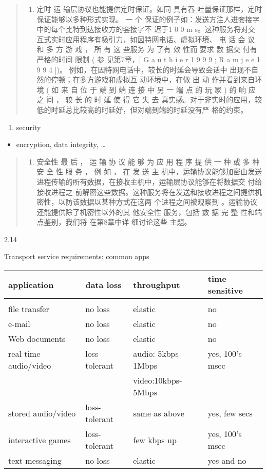 \documentclass[
]{article}
\begin{document}
\begin{quote}
\begin{enumerate}
\def\labelenumi{\arabic{enumi}.}
\item
  定时 运 输层协议也能提供定时保证。如同 具有吞
  吐量保证那样，定时保证能够以多种形式实现。 一 个
  保证的例子如：发送方注人进套接字中的每个比特到达接收方的套接字不 迟于1
  0 0 m s。这种服务将对交
  互式实时应用程序有吸引力，如因特网电话、虚拟环境、 电 话 会 议 和 多
  方 游 戏 ， 所 有 这 些服务 为 了有 效 性而 要求 数 据交
  付有严格的时间 限制 ( 参 见第7章，{[} G a u t h i e r 1 9 9 9 ; R a m
  j e e 1 9 9 4 {]})。 例如，在因特网电话中，较长的时延会导致会话中
  出现不自然的停顿；在多方游戏和虚拟互 动环境中，在做 出 动
  作并看到来自环境 ( 如 来 自 位 于 端 到 端 连 接 中 另 一 端 点 的 玩
  家 ) 的 响 应 之 间 ， 较 长 的 时 延 使 得 它 失 去
  真实感。对于非实时的应用，较低的时延总比较高的时延好，但对端到端的时延没有严
  格的约束。
\end{enumerate}
\end{quote}

\begin{enumerate}
\def\labelenumi{\arabic{enumi}.}
\item
  security
\end{enumerate}

\begin{itemize}
\item
  encryption, data integrity, \ldots{}
\end{itemize}

\begin{quote}
\begin{enumerate}
\def\labelenumi{\arabic{enumi}.}
\item
  安全性 最 后 ， 运 输 协 议 能 够 为 应 用 程 序 提 供 一 种 或 多 种
  安 全 性 服 务 ， 例 如 ， 在 发 送 主
  机中，运输协议能够加密由发送进程传输的所有数据，在接收主机中，运输层协议能够在将数据交
  付给接收进程之
  前解密这些数据。这种服务将在发送和接收进程之间提供机密性，以防该数据以某种方式在这两
  个进程之间被观察到 。运输协议还能提供除了机密性以外的其 他安全性
  服务，包括 数 据 完 整 性和端点鉴别，我们将 在第8章中详 细讨论这些
  主题。
\end{enumerate}
\end{quote}

2.14

Transport service requirements: common apps

\begin{longtable}[]{@{}llll@{}}
\toprule
\textbf{application} & \textbf{data loss} & \textbf{throughput} &
\textbf{time sensitive}\tabularnewline
\midrule
\endhead
& & &\tabularnewline
file transfer & no loss & elastic & no\tabularnewline
e-mail & no loss & elastic & no\tabularnewline
Web documents & no loss & elastic & no\tabularnewline
real-time audio/video & loss-tolerant & audio: 5kbps-1Mbps & yes, 100's
msec\tabularnewline
& & video:10kbps-5Mbps &\tabularnewline
stored audio/video & loss-tolerant & same as above & yes, few
secs\tabularnewline
interactive games & loss-tolerant & few kbps up & yes, 100's
msec\tabularnewline
text messaging & no loss & elastic & yes and no\tabularnewline
\bottomrule
\end{longtable}
\end{document}
